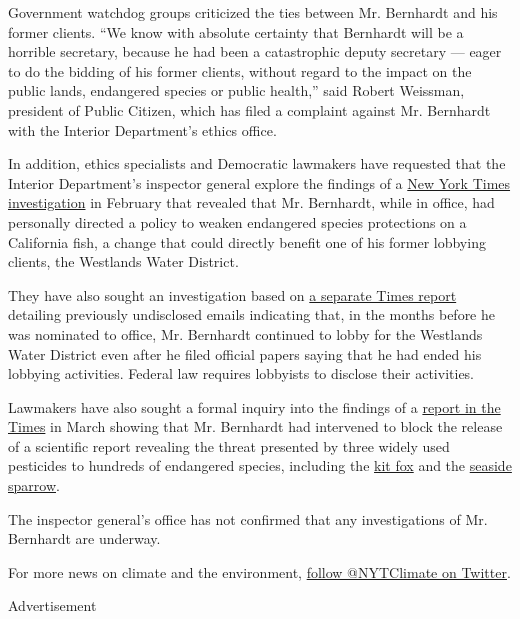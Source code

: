 Government watchdog groups criticized the ties between Mr. Bernhardt and
his former clients. ``We know with absolute certainty that Bernhardt
will be a horrible secretary, because he had been a catastrophic deputy
secretary --- eager to do the bidding of his former clients, without
regard to the impact on the public lands, endangered species or public
health,'' said Robert Weissman, president of Public Citizen, which has
filed a complaint against Mr. Bernhardt with the Interior Department's
ethics office.

In addition, ethics specialists and Democratic lawmakers have requested
that the Interior Department's inspector general explore the findings of
a
\href{https://www.nytimes.com/2019/02/12/climate/david-bernhardt-endangered-species.html?module=inline}{New
York Times investigation} in February that revealed that Mr. Bernhardt,
while in office, had personally directed a policy to weaken endangered
species protections on a California fish, a change that could directly
benefit one of his former lobbying clients, the Westlands Water
District.

They have also sought an investigation based on
\href{https://www.nytimes.com/2019/04/04/climate/david-bernhardt-interior-lobbying.html}{a
separate Times report} detailing previously undisclosed emails
indicating that, in the months before he was nominated to office, Mr.
Bernhardt continued to lobby for the Westlands Water District even after
he filed official papers saying that he had ended his lobbying
activities. Federal law requires lobbyists to disclose their activities.

Lawmakers have also sought a formal inquiry into the findings of a
\href{https://www.nytimes.com/2019/03/26/us/politics/endangered-species-david-bernhardt.html?module=inline}{report
in the Times} in March showing that Mr. Bernhardt had intervened to
block the release of a scientific report revealing the threat presented
by three widely used pesticides to hundreds of endangered species,
including the
\href{https://www.epa.gov/sites/production/files/2013-08/documents/san-joaquin-kitfox.pdf}{kit
fox} and the
\href{https://www.nps.gov/ever/learn/nature/csss.htm}{seaside sparrow}.

The inspector general's office has not confirmed that any investigations
of Mr. Bernhardt are underway.

For more news on climate and the environment,
\href{https://twitter.com/nytclimate}{follow @NYTClimate on Twitter}.

Advertisement

